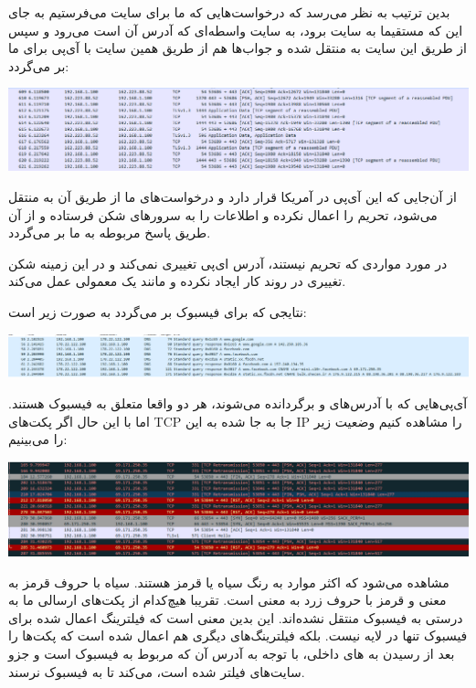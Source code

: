\documentclass[12pt]{article}
\begin{document}
\begin{enumerate}
بدین ترتیب به نظر می‌رسد که درخواست‌هایی که ما برای سایت  می‌فرستیم به جای این که مستقیما به سایت  برود، به سایت واسطه‌ای که آدرس آن  است می‌رود و سپس از طریق این سایت به  منتقل شده و جواب‌ها هم از طریق همین سایت با آی‌پی 
برای ما بر می‌گردد:
		\begin{center}
	\includegraphics[width = 0.5 \textwidth]{images/5.png}
\end{center}

از آن‌جایی که این آی‌پی در آمریکا قرار دارد و درخواست‌های ما از طریق آن به  منتقل می‌شود،  تحریم را اعمال نکرده و اطلاعات را به سرورهای شکن فرستاده و از آن طریق پاسخ مربوطه به ما بر می‌گردد.

در مورد مواردی که تحریم نیستند، آدرس ای‌پی تغییری نمی‌کند و در این زمینه شکن تغییری در روند کار ایجاد نکرده و مانند یک  معمولی عمل می‌کند.


نتایجی که برای فیسبوک بر می‌گردد به صورت زیر است:

		\begin{center}
	\includegraphics[width = 0.5 \textwidth]{images/6.png}
\end{center}

آی‌پی‌هایی که با آدرس‌های
و
برگردانده می‌شوند، هر دو واقعا متعلق به فیسبوک هستند. اما با این حال اگر پکت‌های TCP جا به جا شده به این IP را مشاهده کنیم وضعیت زیر را می‌بینیم:

		\begin{center}
	\includegraphics[width = 0.5 \textwidth]{images/7.png}
	\end{center}

مشاهده می‌شود که اکثر موارد به رنگ سیاه یا قرمز هستند. سیاه با حروف قرمز به معنی  و قرمز با حروف زرد به معنی  است. تقریبا هیچ‌کدام از پکت‌های ارسالی ما به درستی به فیسبوک منتقل نشده‌اند. این بدین معنی است که فیلترینگ اعمال شده برای فیسبوک تنها در لایه  نیست. بلکه فیلترینگ‌های دیگری هم اعمال شده است که پکت‌ها را بعد از رسیدن به ‌های داخلی، با توجه به آدرس آن که مربوط به فیسبوک است و جزو سایت‌های فیلتر شده است،  می‌کند تا به فیسبوک نرسند.


\end{enumerate}
\end{document}
